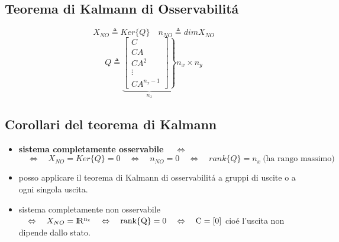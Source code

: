 \documentclass[../main.tex]{subfiles}
\begin{document}
	\subsection{Teorema di Kalmann di Osservabilit\'a}
		\[
			X_{NO} \triangleq Ker\{Q\} \quad n_{NO} \triangleq dim { X_{NO} }
		\]
		\[
			Q \triangleq
			\underbrace{
				\left. 
				\begin{bmatrix}
					C\\
					CA\\
					CA^2\\
					\vdots\\
					CA^{n_x-1}
				\end{bmatrix}
			\right\rbrace 
			}_{n_x}
			n_x \times n_y
		\]
	\subsection{Corollari del teorema di Kalmann}
		\begin{itemize}
			\item
				\textbf{sistema completamente osservabile} $ \quad\Leftrightarrow\quad $
				\[
					\quad\Leftrightarrow\quad X_{NO} = Ker\{Q\} = {0} \quad\Leftrightarrow\quad n_{NO} = 0 \quad\Leftrightarrow\quad rank\{Q\} = n_x\ \text{(ha rango massimo)}
				\]
			\item 
				posso applicare il teorema di Kalmann di osservabilit\'a a gruppi di uscite o a ogni singola uscita.
			\item 
				sistema completamente non osservabile $ \quad\Leftrightarrow\quad X_{NO} = \rm I\!R^{n_x} \quad\Leftrightarrow\quad rank\{Q\} = 0 \quad\Leftrightarrow\quad C = [0] $ cio\'e l'uscita non dipende dallo stato.
		\end{itemize}
	
\end{document}
